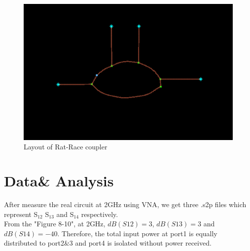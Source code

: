 \documentclass[11pt,a4paper]{report}
\begin{document}
\begin{figure}
\centering
\includegraphics[width=\textwidth]{final.png}
\caption{Layout of Rat-Race coupler}
\end{figure}

\section*{Data\& Analysis}

After measure the real circuit at 2GHz using VNA, we get three .s2p files which represent S\(_{12}\) S\(_{13}\) and S\(_{14}\) respectively. \\

From the "Figure 8-10", at 2GHz, \(dB(S12) = 3\), \(dB(S13) = 3\) and \(dB(S14) = -40\). Therefore, the total input power at port1 is equally distributed to port2\&3 and port4 is isolated without power received.



\end{document}
